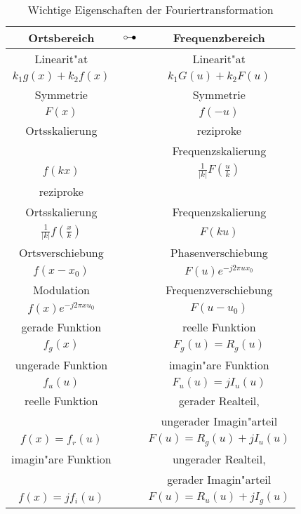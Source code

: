 \begin{table}[H]
 \begin{center}
  \begin{tabular}{|ccc|}
 \hline
 Ortsbereich &$\circ \hspace{-0.15cm} - \hspace{-0.15cm} \bullet$& Frequenzbereich\\\hline
 \hline
 Linearit"at &&  Linearit"at \\
 $k_{1}g(x)+k_{2}f(x)$ && $k_{1}G(u)+k_{2}F(u)$ \\\hline

 Symmetrie   &&  Symmetrie \\
 $F(x)$ && $f(-u)$ \\\hline

 Ortsskalierung && reziproke\\
 && Frequenzskalierung \\
 $f(kx)$ && $\frac{1}{|k|}F(\frac{u}{k})$\\\hline

 reziproke&&\\
 Ortsskalierung && Frequenzskalierung \\
 $\frac{1}{|k|}f(\frac{x}{k})$ && $F(ku)$\\\hline

 Ortsverschiebung && Phasenverschiebung \\
 $f(x-x_{0})$ && $F(u) e^{ -j 2 \pi u x_{0} }$\\\hline

 Modulation && Frequenzverschiebung \\
 $f(x) e^{ -j 2 \pi x u_{0} }$ && $F(u-u_{0})$\\\hline

 gerade Funktion && reelle Funktion \\
 $f_{g}(x)$ && $F_{g}(u)=R_{g}(u)$\\\hline

 ungerade Funktion && imagin"are Funktion \\
 $f_{u}(u)$ && $F_{u}(u)=jI_{u}(u)$\\\hline

 reelle Funktion && gerader Realteil,\\
 && ungerader Imagin"arteil \\
 $f(x)=f_{r}(u)$ && $F(u)=R_{g}(u)+j I_{u}(u)$\\\hline

 imagin"are Funktion && ungerader Realteil, \\
 && gerader Imagin"arteil \\
 $f(x)=j f_{i}(u)$ && $F(u)=R_{u}(u)+j I_{g}(u)$\\\hline

  \end{tabular}
 \end{center}
 \caption[Wichtige Eigenschaften der Fouriertransformation]{
Wichtige Eigenschaften der Fouriertransformation}
 \label{tableeigenft}
\end{table}
